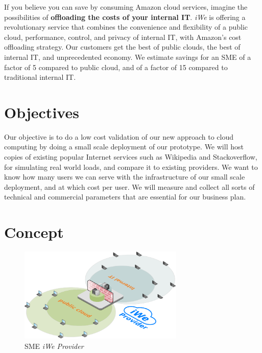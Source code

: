 If you believe you can save by consuming Amazon cloud services, imagine the
possibilities of \textbf{offloading the costs of your internal IT}.
\textit{iWe} is offering a revolutionary service that combines the
convenience and flexibility of a public cloud, performance, control, and privacy
of internal IT, with Amazon's cost offloading strategy. Our customers get the
best of public clouds, the best of internal IT, and unprecedented economy. We
estimate savings for an SME of a factor of 5 compared to public cloud, and of a
factor of 15 compared to traditional internal IT.

\section{Objectives}
\label{sec:objectives}


Our objective is to do a low cost validation of our new approach to cloud
computing by doing a small scale deployment of our prototype. We will host
copies of existing popular Internet services such as Wikipedia and
Stackoverflow, for simulating real world loads, and compare it to existing
providers. We want to know how many users we can serve with the infrastructure
of our small scale deployment, and at which cost per user.  We will measure and
collect all sorts of technical and commercial parameters that are essential for
our business plan.

\section{Concept}
\label{sec:concept}

\begin{figure}
    \centering
    \includegraphics[width=0.7\textwidth]{images/iwe-providers-consumers-with-template2.pdf}
    \caption{SME \textit{iWe Provider}}
    \label{fig:the-clalld-pvt-pub}
\end{figure}

